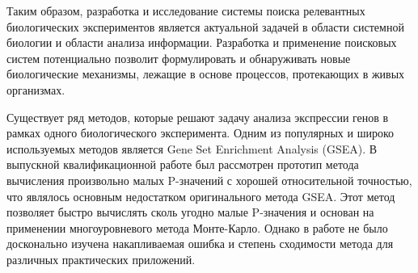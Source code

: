 
Таким образом, разработка и исследование системы поиска релевантных биологических экспериментов является актуальной задачей в области системной биологии и области анализа информации. 
Разработка и применение поисковых систем потенциально позволит формулировать и обнаруживать новые биологические механизмы, лежащие в основе процессов, протекающих в живых организмах.




{\progress} Существует ряд методов, которые решают задачу анализа экспрессии генов в рамках одного биологического эксперимента.
Одним из популярных и широко используемых методов является Gene Set Enrichment Analysis (GSEA).
В выпускной квалификационной работе \cite{KorotkevichVKR} был рассмотрен прототип метода вычисления произвольно малых P-значений с хорошей относительной точностью, что являлось основным недостатком оригинального метода GSEA.
Этот метод позволяет быстро вычислять сколь угодно малые P-значения и основан на применении многоуровневого метода Монте-Карло.
Однако в работе не было досконально изучена накапливаемая ошибка и степень сходимости метода для различных практических приложений.

